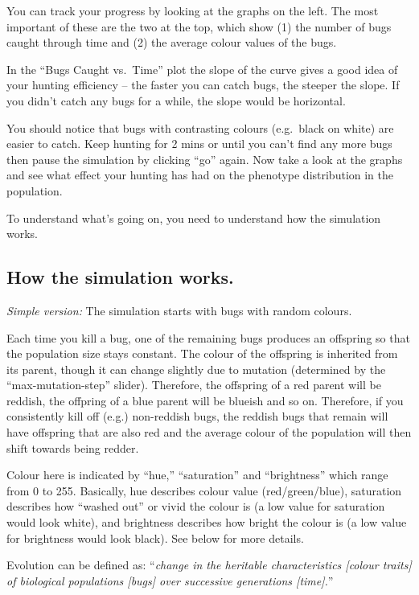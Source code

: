 \documentclass[
  a4paper]{book}
\begin{document}
You can track your progress by looking at the graphs on the left. The
most important of these are the two at the top, which show (1) the
number of bugs caught through time and (2) the average colour values of
the bugs.

In the ``Bugs Caught vs.~Time'' plot the slope of the curve gives a good
idea of your hunting efficiency -- the faster you can catch bugs, the
steeper the slope. If you didn't catch any bugs for a while, the slope
would be horizontal.

You should notice that bugs with contrasting colours (e.g.~black on
white) are easier to catch. Keep hunting for 2 mins or until you can't
find any more bugs then pause the simulation by clicking ``go'' again.
Now take a look at the graphs and see what effect your hunting has had
on the phenotype distribution in the population.

To understand what's going on, you need to understand how the simulation
works.

\hypertarget{how-the-simulation-works.}{%
\subsection{How the simulation works.}\label{how-the-simulation-works.}}

\emph{Simple version:} The simulation starts with bugs with random
colours.

Each time you kill a bug, one of the remaining bugs produces an
offspring so that the population size stays constant. The colour of the
offspring is inherited from its parent, though it can change slightly
due to mutation (determined by the ``max-mutation-step'' slider).
Therefore, the offspring of a red parent will be reddish, the offpring
of a blue parent will be blueish and so on. Therefore, if you
consistently kill off (e.g.) non-reddish bugs, the reddish bugs that
remain will have offspring that are also red and the average colour of
the population will then shift towards being redder.

Colour here is indicated by ``hue,'' ``saturation'' and ``brightness''
which range from 0 to 255. Basically, hue describes colour value
(red/green/blue), saturation describes how ``washed out'' or vivid the
colour is (a low value for saturation would look white), and brightness
describes how bright the colour is (a low value for brightness would
look black). See below for more details.

Evolution can be defined as: ``\emph{change in the heritable
characteristics {[}colour traits{]} of biological populations {[}bugs{]}
over successive generations {[}time{]}.}''
\end{document}
